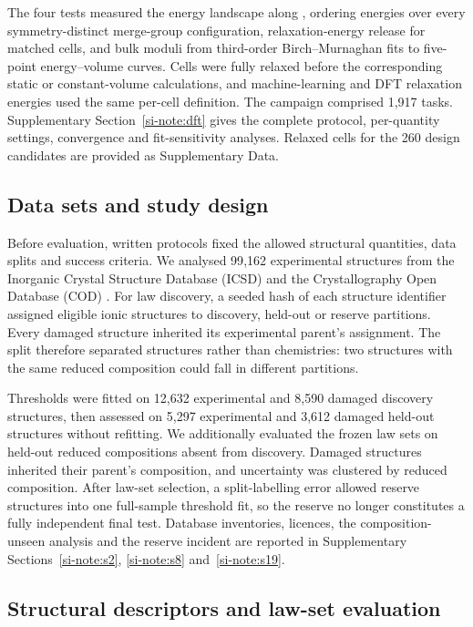 The four tests measured the energy landscape along \rhoc{}, ordering energies over every
symmetry-distinct merge-group configuration, relaxation-energy release for matched cells,
and bulk moduli from third-order Birch--Murnaghan fits to five-point energy--volume curves.
Cells were fully relaxed before the corresponding static or constant-volume calculations,
and machine-learning and DFT relaxation energies used the same per-cell definition. The
campaign comprised 1{,}917 tasks. Supplementary Section~\ref{si-note:dft} gives the complete
protocol, per-quantity settings, convergence and fit-sensitivity analyses. Relaxed cells
for the 260 design candidates are provided as Supplementary Data.

\subsection{Data sets and study design}

Before evaluation, written protocols fixed the allowed structural quantities, data splits
and success criteria. We analysed 99{,}162 experimental structures from the Inorganic
Crystal Structure Database (ICSD) and the Crystallography Open Database (COD)
\cite{zagorac2019recent,grazulis2009crystallography}. For law discovery, a seeded hash of
each structure identifier assigned eligible ionic structures to discovery, held-out or
reserve partitions. Every damaged structure inherited its experimental parent's assignment.
The split therefore separated structures rather than chemistries: two structures with the
same reduced composition could fall in different partitions.

Thresholds were fitted on 12{,}632 experimental and 8{,}590 damaged discovery structures,
then assessed on 5{,}297 experimental and 3{,}612 damaged held-out structures without
refitting. We additionally evaluated the frozen law sets on held-out reduced compositions
absent from discovery. Damaged structures inherited their parent's composition, and
uncertainty was clustered by reduced composition. After law-set selection, a split-labelling error
allowed reserve structures into one full-sample threshold fit, so the reserve no longer
constitutes a fully independent final test. Database inventories, licences, the
composition-unseen analysis and the reserve incident are reported in Supplementary
Sections~\ref{si-note:s2}, \ref{si-note:s8} and~\ref{si-note:s19}.

\subsection{Structural descriptors and law-set evaluation}

